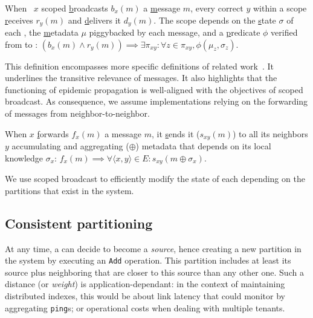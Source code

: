 \begin{definition}
  When \Process~$x$ scoped \underline{b}roadcasts $b_x(m)$ a
  \underline{m}essage $m$, every correct \process $y$ within a scope
  \underline{r}eceives $r_y(m)$ and \underline{d}elivers it
  $d_y(m)$. The scope depends on the \underline{s}tate $\sigma$ of
  each \process, the \underline{m}etadata $\mu$ piggybacked by each
  message, and a \underline{p}redicate $\phi$ verified from \process
  to \process:
  $(b_x(m) \wedge r_y(m)) \implies \exists \pi_{xy}: \forall z \in
  \pi_{xy}, \phi(\mu_z, \sigma_z)$.
\end{definition}

This definition encompasses more specific definitions of related
work~\cite{hsiao2005scoped,lue2006scoped,wang2015prodiluvian}. It
underlines the transitive relevance of messages. It also highlights
that the functioning of epidemic propagation is well-aligned with the
objectives of scoped broadcast. As consequence, we assume
implementations relying on the forwarding of messages from
neighbor-to-neighbor.

\begin{definition}
  When $x$ \underline{f}orwards $f_x(m)$ a message $m$, it
  \underline{s}ends it ($s_{xy}(m)$) to all its neighbors $y$
  accumulating and aggregating ($\oplus$) metadata that depends on its
  local knowledge $\sigma_x$: $f_x(m) \implies \forall \langle x,
  y\rangle \in E: s_{xy}(m \oplus \sigma_x)$.
\end{definition}

We use scoped broadcast to efficiently modify the state of each
\process depending on the partitions that exist in the system.



\subsection{Consistent partitioning}
\label{subsec:consistent}

At any time, a \process can decide to become a \emph{source}, hence
creating a new partition in the system by executing an \texttt{Add}
operation. This partition includes at least its source plus
neighboring \processes that are closer to this source than any other
one. Such a distance (or \emph{weight}) is application-dependant: in
the context of maintaining distributed indexes, this would be about
link latency that \nodes could monitor by aggregating \texttt{ping}s;
or operational costs when dealing with multiple tenants.

